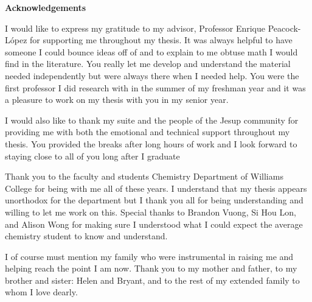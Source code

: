 \setcounter{page}{1}
\thispagestyle{plain}
\begin{center}
	\vspace*{\fill}
	\textbf{Acknowledgements}\\
\end{center}
	I would like to express my gratitude to my advisor, Professor Enrique Peacock-L\'opez for supporting me throughout my thesis. It was always helpful to have someone I could bounce ideas off of and to explain to me obtuse math I would find in the literature. You really let me develop and understand the material needed independently but were always there when I needed help. You were the first professor I did research with in the summer of my freshman year and it was a pleasure to work on my thesis with you in my senior year.
	
	I would also like to thank my suite and the people of the Jesup community for providing me with both the emotional and technical support throughout my thesis. You provided the breaks after long hours of work and I look forward to staying close to all of you long after I graduate

	Thank you to the faculty and students Chemistry Department of Williams College for being with me all of these years. I understand that my thesis appears unorthodox for the department but I thank you all for being understanding and willing to let me work on this. Special thanks to Brandon Vuong, Si Hou Lon, and Alison Wong for making sure I understood what I could expect the average chemistry student to know and understand. 

	I of course must mention my family who were instrumental in raising me and helping reach the point I am now. Thank you to my mother and father, to my brother and sister: Helen and Bryant, and to the rest of my extended family to whom I love dearly.
	\vspace*{\fill}

\pagebreak